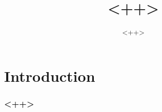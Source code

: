 \documentclass{beamer}
\title{<++>}
\author{<++>}
\begin{document}
\maketitle
\section{Introduction}

\begin{frame}
        \frametitle{<++>}
\end{frame}
\end{document}
